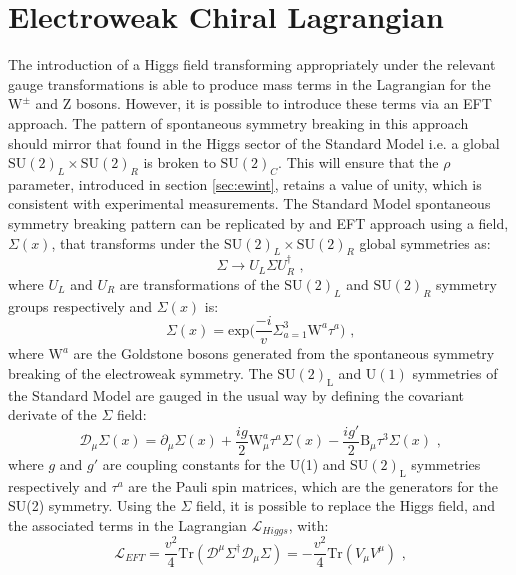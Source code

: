 \section{Electroweak Chiral Lagrangian}
The introduction of a Higgs field transforming appropriately under the relevant gauge transformations is able to produce mass terms in the Lagrangian for the $\text{W}^{\pm}$ and Z bosons.  However, it is possible to introduce these terms via an EFT approach.  The pattern of spontaneous symmetry breaking in this approach should mirror that found in the Higgs sector of the Standard Model i.e. a global $\text{SU}(2)_{L} \times \text{SU}(2)_{R}$ is broken to $\text{SU}(2)_{C}$.  This will ensure that the $\rho$ parameter, introduced in section \ref{sec:ewint}, retains a value of unity, which is consistent with experimental measurements.  The Standard Model spontaneous symmetry breaking pattern can be replicated by and EFT approach using a field, $\Sigma(x)$, that transforms under the $\text{SU}(2)_{L} \times \text{SU}(2)_{R}$ global symmetries as:
%
\begin{equation}
\Sigma \rightarrow U_{L} \Sigma U_{R}^{\dagger} \text{ ,}
\end{equation}
%
\noindent where $U_{L}$ and $U_{R}$ are transformations of the $\text{SU}(2)_{L}$ and $\text{SU}(2)_{R}$ symmetry groups respectively and $\Sigma(x)$ is:
%
\begin{equation}
\Sigma(x) = \text{exp} \bigg(\frac{-i}{v} \Sigma^{3}_{a=1} \text{W}^{a}\tau^{a}\bigg)\text{ ,}
\end{equation}
%
\noindent where $\text{W}^{a}$ are the Goldstone bosons generated from the spontaneous symmetry breaking of the electroweak symmetry.  The $\text{SU}(2)_{\text{L}}$ and $\text{U}(1)$ symmetries of the Standard Model are gauged in the usual way by defining the covariant derivate of the $\Sigma$ field:
%
\begin{equation}
\mathcal{D}_{\mu} \Sigma(x) = \partial_{\mu} \Sigma(x) + \frac{ig}{2}\text{W}_{\mu}^{a}\tau^{a}\Sigma(x) - \frac{ig'}{2}\text{B}_{\mu}\tau^{3}\Sigma(x) \text{ ,}
\end{equation}
%
\noindent where $g$ and $g'$ are coupling constants for the U(1) and SU$(2)_\text{L}$ symmetries respectively and $\tau^{a}$ are the Pauli spin matrices, which are the generators for the SU(2) symmetry.  Using the $\Sigma$ field, it is possible to replace the Higgs field, and the associated terms in the Lagrangian $\mathcal{L}_{Higgs}$, with:
%
\begin{equation}
\mathcal{L}_{EFT} = \frac{v^{2}}{4} \text{Tr} (\mathcal{D}^{\mu} \Sigma^{\dagger} \mathcal{D}_{\mu} \Sigma) = -\frac{v^{2}}{4}\text{Tr}(V_{\mu} V^{\mu}) \text{ ,} 
\end{equation}

